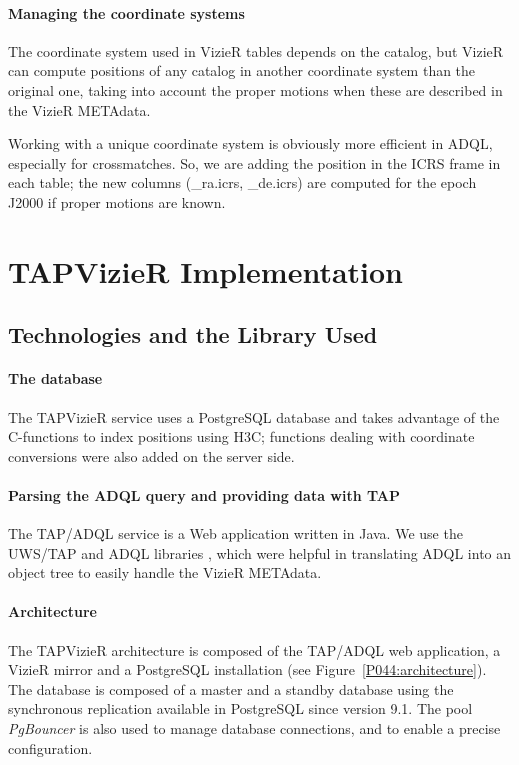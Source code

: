 \paragraph{Managing the coordinate systems}

The coordinate system used in VizieR tables depends on the catalog, but VizieR 
can compute positions of any catalog in another coordinate system than the 
original one, taking into account the proper motions when these are 
described in the VizieR METAdata.

Working with a unique coordinate system is obviously more efficient
in ADQL, especially for crossmatches. So, we are adding the position in 
the ICRS frame in each table; 
the new columns (\_ra.icrs, \_de.icrs) are computed for the epoch J2000 
if proper motions are known.


\section{TAPVizieR Implementation}

\subsection{Technologies and the Library Used}
\paragraph{The database}


The TAPVizieR service uses a PostgreSQL database and takes advantage of the
C-functions to index positions using H3C;  functions dealing with 
coordinate conversions were also added on the server side.

\paragraph{Parsing the ADQL query and providing data with TAP}

The TAP/ADQL service is a Web application written in Java. 
We use the UWS/TAP and ADQL libraries \citep{simbad_tap_2011}, 
which were helpful in translating ADQL into an object tree to 
easily handle the VizieR METAdata. 

\paragraph{Architecture}
The TAPVizieR architecture is composed of the TAP/ADQL web application, a VizieR
mirror and a PostgreSQL installation (see Figure~\ref{P044:architecture}).
The database is composed of a master and a standby database using
the synchronous replication available in PostgreSQL since version 9.1.
The pool {\em PgBouncer} is also used to manage database connections, and to
enable a precise configuration. 

